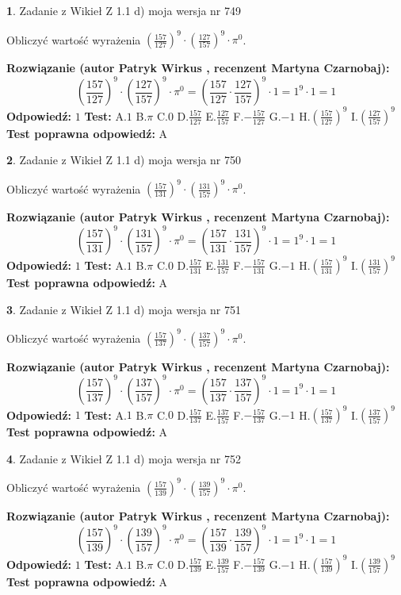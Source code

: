\documentclass[12pt, a4paper]{article}
\theoremstyle{definition} %
\newtheorem{zad}{}
\newcommand{\zadStart}[1]{\begin{zad}#1\newline}
\newcommand{\zadStop}{\end{zad}}
\newcommand{\rozwStart}[2]{\noindent \textbf{Rozwiązanie (autor #1 , recenzent #2): }\newline}
\newcommand{\rozwStop}{\newline}
\newcommand{\odpStart}{\noindent \textbf{Odpowiedź:}\newline}
\newcommand{\odpStop}{\newline}
\newcommand{\testStart}{\noindent \textbf{Test:}\newline}
\newcommand{\testStop}{\newline}
\newcommand{\kluczStart}{\noindent \textbf{Test poprawna odpowiedź:}\newline}
\newcommand{\kluczStop}{\newline}
\begin{document}
\zadStart{Zadanie z Wikieł Z 1.1 d) moja wersja nr 749}

Obliczyć wartość wyrażenia $(\frac{157}{127})^{9} \cdot (\frac{127}{157})^{9} \cdot \pi^{0}$.
\zadStop
\rozwStart{Patryk Wirkus}{Martyna Czarnobaj}
$$(\frac{157}{127})^{9} \cdot (\frac{127}{157})^{9} \cdot \pi^{0} = (\frac{157}{127} \cdot \frac{127}{157})^{9} \cdot 1 = 1^{9} \cdot 1 = 1$$
\rozwStop
\odpStart
$1$
\odpStop
\testStart
A.$1$ B.$\pi$ C.$0$ D.$\frac{157}{127}$ E.$\frac{127}{157}$
F.$-\frac{157}{127}$ G.$-1$
H.$(\frac{157}{127})^{9}$
I.$(\frac{127}{157})^{9}$
\testStop
\kluczStart
A
\kluczStop



\zadStart{Zadanie z Wikieł Z 1.1 d) moja wersja nr 750}

Obliczyć wartość wyrażenia $(\frac{157}{131})^{9} \cdot (\frac{131}{157})^{9} \cdot \pi^{0}$.
\zadStop
\rozwStart{Patryk Wirkus}{Martyna Czarnobaj}
$$(\frac{157}{131})^{9} \cdot (\frac{131}{157})^{9} \cdot \pi^{0} = (\frac{157}{131} \cdot \frac{131}{157})^{9} \cdot 1 = 1^{9} \cdot 1 = 1$$
\rozwStop
\odpStart
$1$
\odpStop
\testStart
A.$1$ B.$\pi$ C.$0$ D.$\frac{157}{131}$ E.$\frac{131}{157}$
F.$-\frac{157}{131}$ G.$-1$
H.$(\frac{157}{131})^{9}$
I.$(\frac{131}{157})^{9}$
\testStop
\kluczStart
A
\kluczStop



\zadStart{Zadanie z Wikieł Z 1.1 d) moja wersja nr 751}

Obliczyć wartość wyrażenia $(\frac{157}{137})^{9} \cdot (\frac{137}{157})^{9} \cdot \pi^{0}$.
\zadStop
\rozwStart{Patryk Wirkus}{Martyna Czarnobaj}
$$(\frac{157}{137})^{9} \cdot (\frac{137}{157})^{9} \cdot \pi^{0} = (\frac{157}{137} \cdot \frac{137}{157})^{9} \cdot 1 = 1^{9} \cdot 1 = 1$$
\rozwStop
\odpStart
$1$
\odpStop
\testStart
A.$1$ B.$\pi$ C.$0$ D.$\frac{157}{137}$ E.$\frac{137}{157}$
F.$-\frac{157}{137}$ G.$-1$
H.$(\frac{157}{137})^{9}$
I.$(\frac{137}{157})^{9}$
\testStop
\kluczStart
A
\kluczStop



\zadStart{Zadanie z Wikieł Z 1.1 d) moja wersja nr 752}

Obliczyć wartość wyrażenia $(\frac{157}{139})^{9} \cdot (\frac{139}{157})^{9} \cdot \pi^{0}$.
\zadStop
\rozwStart{Patryk Wirkus}{Martyna Czarnobaj}
$$(\frac{157}{139})^{9} \cdot (\frac{139}{157})^{9} \cdot \pi^{0} = (\frac{157}{139} \cdot \frac{139}{157})^{9} \cdot 1 = 1^{9} \cdot 1 = 1$$
\rozwStop
\odpStart
$1$
\odpStop
\testStart
A.$1$ B.$\pi$ C.$0$ D.$\frac{157}{139}$ E.$\frac{139}{157}$
F.$-\frac{157}{139}$ G.$-1$
H.$(\frac{157}{139})^{9}$
I.$(\frac{139}{157})^{9}$
\testStop
\kluczStart
A
\kluczStop
\end{document}
